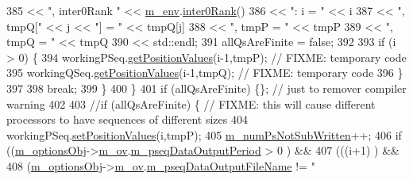 \begin{DoxyCode}
385                   << \textcolor{stringliteral}{", inter0Rank "}     << \hyperlink{class_q_u_e_s_o_1_1_monte_carlo_s_g_a30055a359b22cde54681679aed8ae6e7}{m\_env}.\hyperlink{class_q_u_e_s_o_1_1_base_environment_ae106b5bb8a80b655b88b3a26b1e7c185}{inter0Rank}()
386                   << \textcolor{stringliteral}{": i = "}            << i
387                   << \textcolor{stringliteral}{", tmpQ["} << j << \textcolor{stringliteral}{"] = "} << tmpQ[j]
388                   << \textcolor{stringliteral}{", tmpP = "}         << tmpP
389                   << \textcolor{stringliteral}{", tmpQ = "}         << tmpQ
390                   << std::endl;
391         allQsAreFinite = \textcolor{keyword}{false};
392 
393         \textcolor{keywordflow}{if} (i > 0) \{
394           workingPSeq.\hyperlink{class_q_u_e_s_o_1_1_base_vector_sequence_a656d47a18b401d6d914b0daf2dea88b0}{getPositionValues}(i-1,tmpP); \textcolor{comment}{// FIXME: temporary code}
395           workingQSeq.\hyperlink{class_q_u_e_s_o_1_1_base_vector_sequence_a656d47a18b401d6d914b0daf2dea88b0}{getPositionValues}(i-1,tmpQ); \textcolor{comment}{// FIXME: temporary code}
396         \}
397 
398         \textcolor{keywordflow}{break};
399       \}
400     \}
401     \textcolor{keywordflow}{if} (allQsAreFinite) \{\}; \textcolor{comment}{// just to remover compiler warning}
402 
403     \textcolor{comment}{//if (allQsAreFinite) \{ // FIXME: this will cause different processors to have sequences of different
       sizes}
404       workingPSeq.\hyperlink{class_q_u_e_s_o_1_1_base_vector_sequence_a5bcce98b68e0e24c05136e7a3bb50c12}{setPositionValues}(i,tmpP);
405       \hyperlink{class_q_u_e_s_o_1_1_monte_carlo_s_g_a1bd46f12e850ab8d239205aafdae72af}{m\_numPsNotSubWritten}++;
406       \textcolor{keywordflow}{if} ((\hyperlink{class_q_u_e_s_o_1_1_monte_carlo_s_g_acf7ce935648fd3a5d0ee23685708b4ca}{m\_optionsObj}->\hyperlink{class_q_u_e_s_o_1_1_monte_carlo_s_g_options_a4bc6849a41ede87425cad9ab6e97df11}{m\_ov}.\hyperlink{class_q_u_e_s_o_1_1_mc_options_values_a7e7f833d945cdfecac2000196fae1aa8}{m\_pseqDataOutputPeriod}           >  0  
      ) && 
407           (((i+1) %
      ) &&
408           (\hyperlink{class_q_u_e_s_o_1_1_monte_carlo_s_g_acf7ce935648fd3a5d0ee23685708b4ca}{m\_optionsObj}->\hyperlink{class_q_u_e_s_o_1_1_monte_carlo_s_g_options_a4bc6849a41ede87425cad9ab6e97df11}{m\_ov}.\hyperlink{class_q_u_e_s_o_1_1_mc_options_values_a8db3604c003959cb7ae7144a6bb37834}{m\_pseqDataOutputFileName}         != \textcolor{stringliteral}{"
}
\end{DoxyCode}
